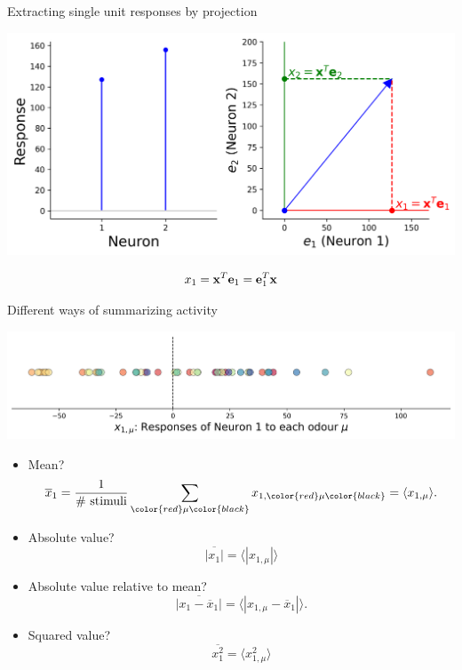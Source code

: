 \documentclass[presentation,smaller]{beamer}
\begin{document}
\begin{frame}[label={sec:orgdfa3f8b}]{Extracting single unit responses by projection}
\begin{center}
\includegraphics[width=1.0\textwidth]{figures/projections.png}
\end{center}
  $$ x_1 = \mathbf{x}^T \mathbf e_1 = \mathbf e_1^T \mathbf{x} $$
\end{frame}
\begin{frame}[label={sec:org6b99b7d}]{Different ways of summarizing activity}
\begin{center}
\includegraphics[width=1.0\textwidth]{figures/neuron0.png}
\end{center}  
\begin{itemize}
\item Mean?
$$ \overline{x}_1 = {1 \over \text{\# stimuli}} \sum_{\color{red}\mu\color{black}} x_{1,\color{red}\mu\color{black}} = \langle x_{1,\mu} \rangle.$$
\item Absolute value? $$\overline{|x_1|} = \langle |x_{1,\mu}| \rangle$$
\item Absolute value relative to mean?
$$ \overline{|x_1 - \overline{x}_1|} = \langle |x_{1,\mu} - \overline{x}_1 | \rangle.$$
\item Squared value?
$$ \overline{x^2_1} = \langle x^2_{1,\mu} \rangle$$
\end{itemize}
\end{frame}
\end{document}
